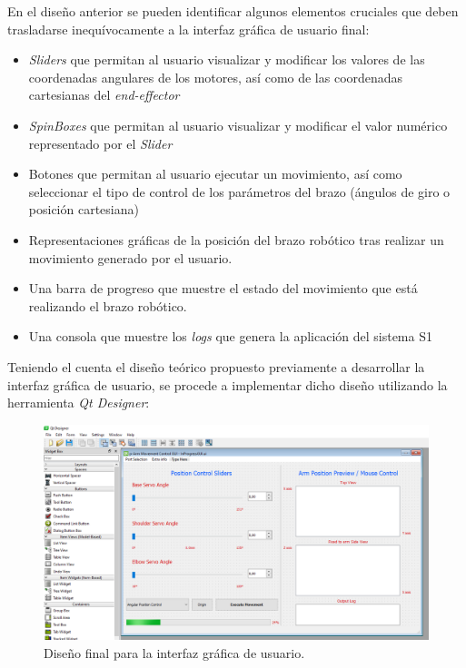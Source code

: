 En el diseño anterior se pueden identificar algunos elementos cruciales que deben trasladarse inequívocamente a la interfaz gráfica de usuario final:
\begin{itemize}
    \item \textit{Sliders} que permitan al usuario visualizar y modificar los valores de las coordenadas angulares de los motores, así como de las coordenadas cartesianas del \textit{end-effector}
    
    \item \textit{SpinBoxes} que permitan al usuario visualizar y modificar el valor numérico representado por el \textit{Slider}
    
    \item Botones que permitan al usuario ejecutar un movimiento, así como seleccionar el tipo de control de los parámetros del brazo (ángulos de giro o posición cartesiana)
    
    \item Representaciones gráficas de la posición del brazo robótico tras realizar un movimiento generado por el usuario.
    
    \item Una barra de progreso que muestre el estado del movimiento que está realizando el brazo robótico.
    
    \item Una consola que muestre los \textit{logs} que genera la aplicación del sistema \ac{S1}
\end{itemize}

Teniendo el cuenta el diseño teórico propuesto previamente a desarrollar la interfaz gráfica de usuario, se procede a implementar dicho diseño utilizando la herramienta \textit{Qt Designer}:

\begin{figure}[H]
    \centering
    \includegraphics[width=0.8\linewidth]{pictures/DesignerGui.PNG}
    \caption{Diseño final para la interfaz gráfica de usuario.}
    \label{fig:ui_QtDesigner}
\end{figure}

